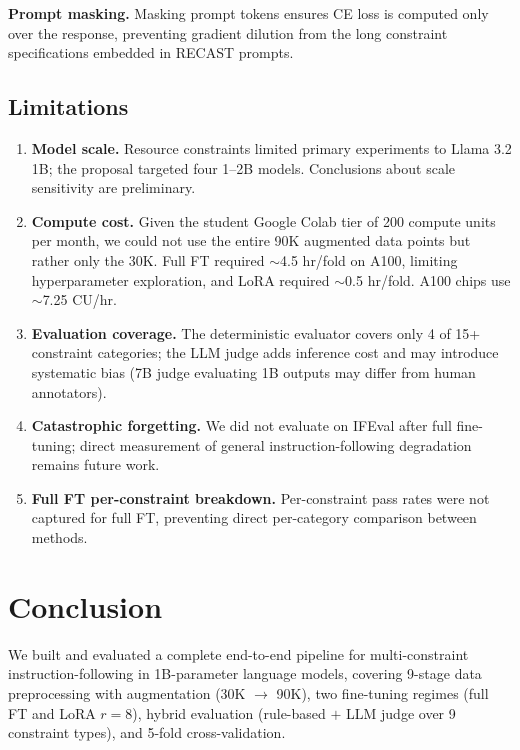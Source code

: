 \documentclass[10pt]{article}
\begin{document}
\textbf{Prompt masking.} Masking prompt tokens ensures CE loss is computed
only over the response, preventing gradient dilution from the long
constraint specifications embedded in RECAST prompts.

\subsection{Limitations}
\begin{enumerate}
  \item \textbf{Model scale.} Resource constraints limited primary
        experiments to Llama 3.2 1B; the proposal targeted four 1--2B
        models. Conclusions about scale sensitivity are preliminary.
  \item \textbf{Compute cost.} Given the student Google Colab tier of 200 compute units per month, we could not use the entire 90K augmented data points but rather only the 30K. Full FT required $\sim$4.5 hr/fold on A100,
        limiting hyperparameter exploration, and LoRA required $\sim$0.5 hr/fold. A100 chips use $\sim$7.25 CU/hr.
  \item \textbf{Evaluation coverage.} The deterministic evaluator covers
        only 4 of 15+ constraint categories; the LLM judge adds inference
        cost and may introduce systematic bias (7B judge evaluating 1B
        outputs may differ from human annotators).
  \item \textbf{Catastrophic forgetting.} We did not evaluate on IFEval
        after full fine-tuning; direct measurement of general
        instruction-following degradation remains future work.
  \item \textbf{Full FT per-constraint breakdown.} Per-constraint pass
        rates were not captured for full FT, preventing direct
        per-category comparison between methods.
\end{enumerate}

\section{Conclusion}

We built and evaluated a complete end-to-end pipeline for multi-constraint
instruction-following in 1B-parameter language models, covering 9-stage
data preprocessing with augmentation (30K $\to$ 90K), two fine-tuning
regimes (full FT and LoRA $r{=}8$), hybrid evaluation (rule-based $+$ LLM
judge over 9 constraint types), and 5-fold cross-validation.
\end{document}

